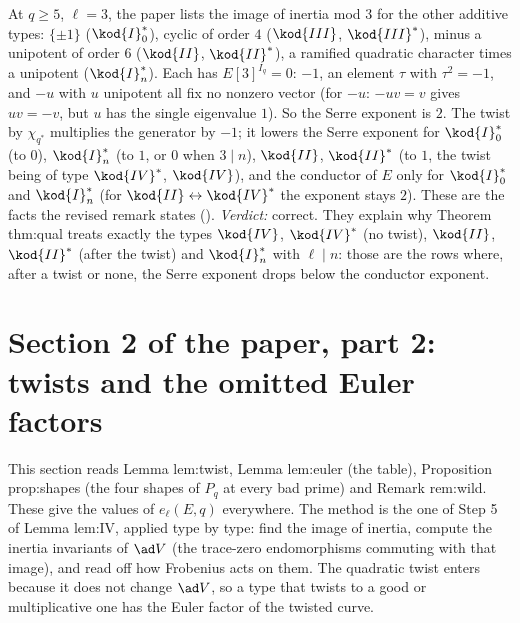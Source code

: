 \begin{sloppypar}
\begin{remark}\label{rem:paper:types}
At $q\ge5$, $\ell=3$, the paper lists the image of inertia mod $3$ for the other additive types: $\{\pm1\}$ ($\kod{I}_0^*$), cyclic of order $4$ ($\kod{III}$, $\kod{III}^*$), minus a
unipotent of order $6$ ($\kod{II}$, $\kod{II}^*$), a ramified quadratic character times a unipotent ($\kod{I}_n^*$). Each has $E[3]^{I_q}=0$: $-1$, an element $\tau$ with $\tau^2=-1$,
and $-u$ with $u$ unipotent all fix no nonzero vector (for $-u$: $-uv=v$ gives $uv=-v$, but $u$ has the single eigenvalue $1$). So the Serre exponent is $2$. The twist by
$\chi_{q^*}$ multiplies the generator by $-1$; it lowers the Serre exponent for $\kod{I}_0^*$ (to $0$), $\kod{I}_n^*$ (to $1$, or $0$ when $3\mid n$), $\kod{II}$, $\kod{II}^*$ (to $1$, the twist
being of type $\kod{IV}^*$, $\kod{IV}$), and the conductor of $E$ only for $\kod{I}_0^*$ and $\kod{I}_n^*$ (for $\kod{II}\leftrightarrow\kod{IV}^*$ the exponent stays $2$). These are the facts the revised
remark states (). \emph{Verdict:} correct. They explain why Theorem thm:qual treats exactly the types $\kod{IV}$, $\kod{IV}^*$ (no twist), $\kod{II}$, $\kod{II}^*$ (after the
twist) and $\kod{I}_n^*$ with $\ell\mid n$: those are the rows where, after a twist or none, the Serre exponent drops below the conductor exponent.
\end{remark}

\section[Paper 2: twists and Euler factors]{Section 2 of the paper, part 2: twists and the omitted Euler factors}\label{sec:paper:twists-euler}

This section reads Lemma lem:twist, Lemma lem:euler (the table), Proposition prop:shapes (the four shapes of $P_q$ at every bad prime) and Remark
rem:wild. These give the values of $e_\ell(E,q)$ everywhere. The method is the one of Step 5 of Lemma lem:IV, applied type by type: find the image of inertia, compute the
inertia invariants of $\ad V$ (the trace-zero endomorphisms commuting with that image), and read off how Frobenius acts on them. The quadratic twist enters because it does
not change $\ad V$, so a type that twists to a good or multiplicative one has the Euler factor of the twisted curve.


\end{sloppypar}
